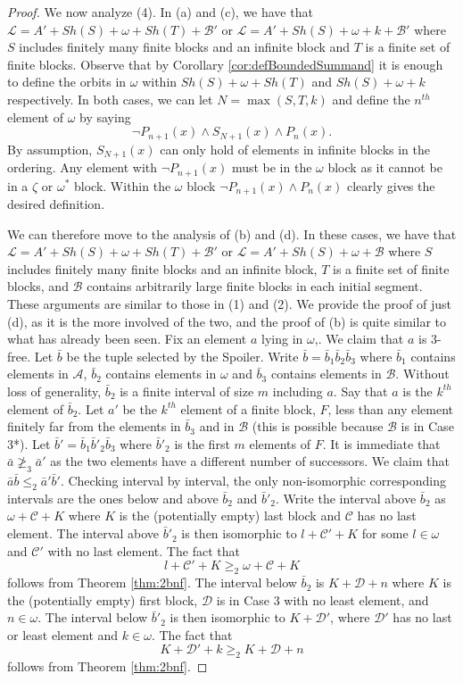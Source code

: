 \documentclass[11pt]{amsart}
\theoremstyle{definition}
\def\A{\mathcal A}
\def\B{\mathcal{B}}
\def\C{\mathcal{C}}
\def\D{{\mathcal D}}
\def\L{\mathcal L}
\begin{document}
\begin{proof}
    We now analyze (4).
    In (a) and (c), we have that $\L=A'+Sh(S)+\omega+Sh(T)+\B'$ or $\L=A'+Sh(S)+\omega+k+\B'$ where $S$ includes finitely many finite blocks and an infinite block and $T$ is a finite set of finite blocks. 
    Observe that by Corollary \ref{cor:defBoundedSummand} it is enough to define the orbits in $\omega$ within $Sh(S)+\omega+Sh(T)$ and $Sh(S)+\omega+k$ respectively.
    In both cases, we can let $N=\max(S,T,k)$ and define the $n^{th}$ element of $\omega$ by saying
    \[\lnot P_{n+1}(x)\land S_{N+1}(x)\land P_n(x).\]
    By assumption, $S_{N+1}(x)$ can only hold of elements in infinite blocks in the ordering.
    Any element with $\lnot P_{n+1}(x)$ must be in the $\omega$ block as it cannot be in a $\zeta$ or $\omega^*$ block.
    Within the $\omega$ block $\lnot P_{n+1}(x)\land P_n(x)$ clearly gives the desired definition.

    We can therefore move to the analysis of (b) and (d).
    In these cases, we have that $\L=A'+Sh(S)+\omega+Sh(T)+\B'$ or $\L=A'+Sh(S)+\omega+\B$ where $S$ includes finitely many finite blocks and an infinite block, $T$ is a finite set of finite blocks, and $\B$ contains arbitrarily large finite blocks in each initial segment.
    These arguments are similar to those in (1) and (2).
    We provide the proof of just (d), as it is the more involved of the two, and the proof of (b) is quite similar to what has already been seen.
    Fix an element $a$ lying in $\omega$,.
    We claim that $a$ is $3$-free.
    Let $\bar{b}$ be the tuple selected by the Spoiler.
    Write $\bar{b}=\bar{b}_1\bar{b}_2\bar{b}_3$ where $\bar{b}_1$ contains elements in $\A$, $\bar{b}_2$ contains elements in $\omega$ and $\bar{b}_3$ contains elements in $\B$.
    Without loss of generality, $\bar{b}_2$ is a finite interval of size $m$ including $a$.
    Say that $a$ is the $k^{th}$ element of $\bar{b}_2$.
    Let $a'$ be the $k^{th}$ element of a finite block, $F$, less than any element finitely far from the elements in $\bar{b}_3$ and in $\B$ (this is possible because $\B$ is in Case 3*).
    Let $\bar{b}'=\bar{b}_1\bar{b}'_2\bar{b}_3$ where $\bar{b}'_2$ is the first $m$ elements of $F$.
    It is immediate that $\bar{a}\not\geq_3\bar{a}'$ as the two elements have a different number of successors. 
    We claim that $\bar{a}\bar{b}\leq_2\bar{a}'\bar{b}'$.
    Checking interval by interval, the only non-isomorphic corresponding intervals are the ones below and above $\bar{b}_2$ and $\bar{b}'_2$.
    Write the interval above $\bar{b}_2$ as $\omega+\C+K$ where $K$ is the (potentially empty) last block and $\C$ has no last element.
    The interval above $\bar{b}'_2$ is then isomorphic to $l+\C'+K$ for some $l\in\omega$ and $\C'$ with no last element.
    The fact that
    \[l+\C'+K\geq_2 \omega+\C+K\]
    follows from Theorem \ref{thm:2bnf}.
    The interval below $\bar{b}_2$ is $K+\D+n$ where $K$ is the (potentially empty) first block, $\D$ is in Case 3 with no least element, and $n\in\omega$.
    The interval below $\bar{b}'_2$ is then isomorphic to $K+\D'$, where $\D'$ has no last or least element and $k\in\omega$.
    The fact that
    \[K+\D'+k\geq_2K+\D+n\]
    follows from Theorem \ref{thm:2bnf}.
\end{proof}
\end{document}
